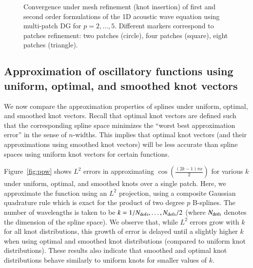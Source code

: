 \documentclass[preprint,10pt]{elsarticle}
\newcommand{\LRp}[1]{\left( #1 \right)}
\newcommand{\reviewerOne}[1]{#1}
\begin{document}
\begin{figure}
{
}
\caption{Convergence under mesh refinement (knot insertion) of first and second order formulations of the 1D acoustic wave equation using multi-patch DG for $p = 2,\ldots,5$.  Different markers correspond to patches refinement: two patches (circle), four patches (square), eight patches (triangle).  }
\label{fig:convergence1D}
\end{figure}


\subsection{Approximation of oscillatory functions using uniform, optimal, and smoothed knot vectors}
\label{sec:approx}

We now compare the approximation properties of splines under uniform, optimal, and smoothed knot vectors.  Recall that optimal knot vectors are defined such that the corresponding spline space minimizes the ``worst best approximation error'' in the sense of $n$-widths.  This implies that optimal knot vectors (and their approximations using smoothed knot vectors) will be less accurate than spline spaces using uniform knot vectors for certain functions.  

Figure~\ref{fig:ppw} shows $L^2$ errors in approximating $\cos\LRp{\frac{(2k-1)\pi x}{2}}$ for various $k$ under uniform, optimal, and smoothed knots over a single patch.  \reviewerOne{Here, we approximate the function using an $L^2$ projection, using a composite Gaussian quadrature rule which is exact for the product of two degree $p$ B-splines.}  The number of wavelengths is taken to be $k = 1/{N_{\rm dofs}},\ldots, N_{\rm dofs}/2$ (where $N_{\rm dofs}$ denotes the dimension of the spline space).  We observe that, while $L^2$ errors grow with $k$ for all knot distributions, this growth of error is delayed until a slightly higher $k$ when using optimal and smoothed knot distributions (compared to uniform knot distributions).  These results also indicate that smoothed and optimal knot distributions behave similarly to uniform knots for smaller values of $k$.  
\end{document}
